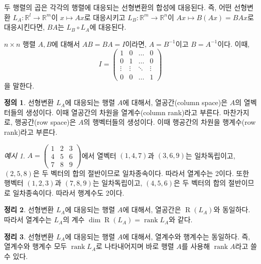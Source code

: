 \documentclass[unfonts,oneside,a4paper]{oblivoir}
\theoremstyle{definition}
\newtheorem{definition}{정의}[section]
\theoremstyle{theorem}
\newtheorem{theorem}[definition]{정리}
\theoremstyle{theorem}
\theoremstyle{remark}
\theoremstyle{remark}
\theoremstyle{remark}
\newtheorem*{example}{예시}
\theoremstyle{remark}
\renewcommand{\vec}[1]{\bm{\mathit{#1}}}
\DeclareMathOperator{\Range}{R}
\DeclareMathOperator{\rank}{rank}
\begin{document}
두 행렬의 곱은 각각의 행렬에 대응되는 선형변환의 합성에 대응된다.
즉, 어떤 선형변환 $L_A: \mathbb R^l \rightarrow \mathbb R^m$이 $\vec x \mapsto A \vec x$로 대응시키고 $L_B: \mathbb R^m \rightarrow \mathbb R^n$이 $A \vec x \mapsto B(A \vec x) = BA \vec x$로 대응시킨다면, $BA$는 $L_B \circ L_A$에 대응된다.

$n \times n$ 행렬 $A, B$에 대해서 $AB = BA = I$이라면, $A = B^{-1}$이고 $B = A^{-1}$이다.
이때,
\begin{equation*}
    I = \begin{pmatrix}
        1 & 0 & \dots & 0\\
        0 & 1 & \dots & 0\\
        \vdots & \vdots & \ddots & \vdots\\
        0 & 0 & \dots & 1
    \end{pmatrix}
\end{equation*}
을 말한다.

\begin{definition}
    선형변환 $L_A$에 대응되는 행렬 $A$에 대해서, 열공간(column space)은 $A$의 열벡터들의 생성이다.
    이때 열공간의 차원을 열계수(column rank)라고 부른다.
    마찬가지로, 행공간(row space)은 $A$의 행벡터들의 생성이다.
    이때 행공간의 차원을 행계수(row rank)라고 부른다.
\end{definition}

\begin{example}
    $A = \begin{pmatrix}
        1 & 2 & 3\\
        4 & 5 & 6\\
        7 & 8 & 9
    \end{pmatrix}$에서 열벡터 $(1, 4, 7)$과 $(3, 6, 9)$는 일차독립이고, $(2, 5, 8)$은 두 벡터의 합의 절반이므로 일차종속이다.
    따라서 열계수는 2이다.
    또한 행벡터 $(1, 2, 3)$과 $(7, 8, 9)$는 일차독립이고, $(4, 5, 6)$은 두 벡터의 합의 절반이므로 일차종속이다.
    따라서 행계수도 2이다.
\end{example}

\begin{theorem} \label{thm:rank_matrix}
    선형변환 $L_A$에 대응되는 행렬 $A$에 대해서, 열공간은 $\Range(L_A)$와 동일하다.
    따라서 열계수는 $L_A$의 계수 $\dim \Range(L_A) = \rank L_A$와 같다.
\end{theorem}

\begin{theorem} \label{thm:rank}
    선형변환 $L_A$에 대응되는 행렬 $A$에 대해서, 열계수와 행계수는 동일하다.
    즉, 열계수와 행계수 모두 $\rank L_A$로 나타내어지며 바로 행렬 $A$를 사용해 $\rank A$라고 쓸 수 있다.
\end{theorem}
\end{document}
